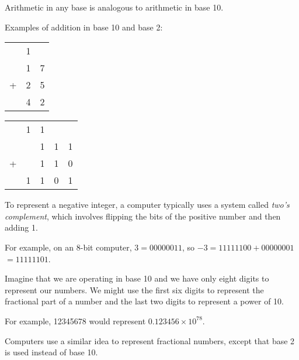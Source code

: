 \documentclass[8pt,a4paper,compress,handout]{beamer}
\begin{document}
\begin{frame}[fragile]
Arithmetic in any base is analogous to arithmetic in base 10.

\bigskip

Examples of addition in base 10 and base 2:
\begin{center}

\begin{tabular}{ccc}
  & 1 &   \\ 
  & 1 & 7 \\
+ & 2 & 5 \\
\hline
  & 4 & 2 \\
\end{tabular}\hspace{2cm} \begin{tabular}{ccccc}
  & 1 & 1 &   \\ 
  &   & 1 & 1 & 1 \\
+ &   & 1 & 1 & 0 \\
\hline
  & 1 & 1 & 0 & 1 \\
\end{tabular}
\end{center}

\bigskip

To represent a negative integer, a computer typically uses a system called \emph{two's complement}, which involves flipping the bits of the positive number and then adding 1. 

\bigskip

For example, on an 8-bit computer, $3 = 00000011$, so $-3 = 11111100 + 00000001$ $= 11111101$.
\end{frame}

\begin{frame}[fragile]
Imagine that we are operating in base 10 and we have only eight digits to represent our numbers. We might use the first six digits to represent the fractional part of a number and the last two digits to represent a power of 10.  

\bigskip

For example, 12345678 would represent $0.123456 \times 10^{78}$. 

\bigskip

Computers use a similar idea to represent fractional numbers, except that base 2 is used instead of base 10.
\end{frame}
\end{document}
